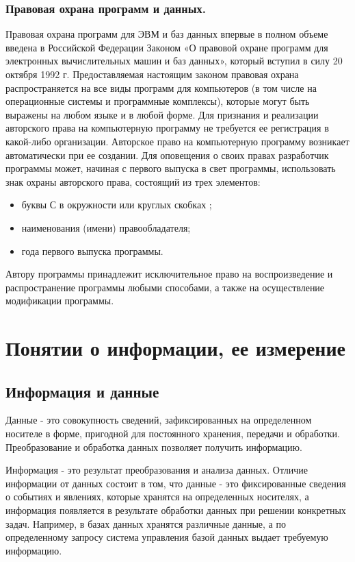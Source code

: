 \documentclass[a4paper]{article}
\begin{document}
\subsubsection{Правовая охрана программ и данных.}

Правовая охрана программ для ЭВМ и баз данных впервые в полном объеме введена в Российской Федерации Законом «О правовой охране программ для электронных вычислительных машин и баз данных», который вступил в силу 20 октября 1992 г. Предоставляемая настоящим законом правовая охрана распространяется на все виды программ для компьютеров (в том числе на операционные системы и программные комплексы), которые могут быть выражены на любом языке и в любой форме. Для признания и реализации авторского права на компьютерную программу не требуется ее регистрация в какой-либо организации. Авторское право на компьютерную программу возникает автоматически при ее создании. Для оповещения о своих правах разработчик программы может, начиная с первого выпуска в свет программы, использовать знак охраны авторского права, состоящий из трех элементов:

\begin{itemize}
\item буквы С в окружности или круглых скобках \textcopyright;
\item наименования (имени) правообладателя;
\item года первого выпуска программы.       
\end{itemize}
Автору программы принадлежит исключительное право на воспроизведение и распространение программы любыми способами, а также на осуществление модификации программы.

\section{Понятии о информации, ее измерение}

\subsection{Информация и данные}

 Данные - это совокупность сведений, зафиксированных на определенном носителе в форме, пригодной для постоянного хранения, передачи и обработки. Преобразование и обработка данных позволяет получить информацию.

 Информация - это результат преобразования и анализа данных. Отличие информации от данных состоит в том, что данные - это фиксированные сведения о событиях и явлениях, которые хранятся на определенных носителях, а информация появляется в результате обработки данных при решении конкретных задач. Например, в базах данных хранятся различные данные, а по определенному запросу система управления базой данных выдает требуемую информацию.
\end{document}

